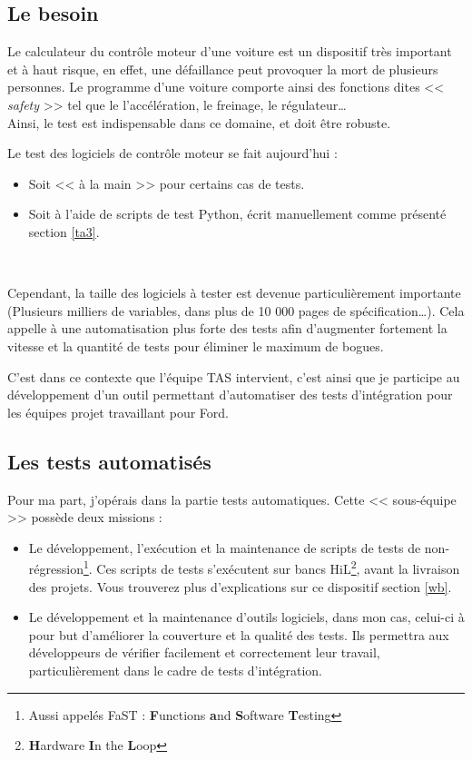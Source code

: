 \subsection{Le besoin} \label{besoinTests}
Le calculateur du contrôle moteur d'une voiture est un dispositif très important et à haut risque, en effet, une défaillance peut provoquer la mort de plusieurs personnes. Le programme d'une voiture comporte ainsi des fonctions dites << \textit{safety} >> tel que le l'accélération, le freinage, le régulateur\ldots\\
Ainsi, le test est indispensable dans ce domaine, et doit être robuste. 

Le test des logiciels de contrôle moteur se fait aujourd'hui : 
\begin{itemize}
	\item Soit << à la main >> pour certains cas de tests.
	\item Soit à l'aide de scripts de test Python, écrit manuellement comme présenté section \ref{ta3}.
\end{itemize}~

Cependant, la taille des logiciels à tester est devenue particulièrement importante (Plusieurs milliers de variables, dans plus de 10 000 pages de spécification\ldots). Cela appelle à une automatisation plus forte des tests afin d'augmenter fortement la vitesse et la quantité de tests pour éliminer le maximum de bogues.

C'est dans ce contexte que l'équipe TAS intervient, c'est ainsi que je participe au développement d'un outil permettant d'automatiser des tests d'intégration pour les équipes projet travaillant pour Ford.
\subsection{Les tests automatisés}

Pour ma part, j'opérais dans la partie tests automatiques. Cette << sous-équipe >> possède deux missions : 
\begin{itemize}
	\item Le développement, l'exécution et la maintenance de scripts de tests de non-régression\footnote{Aussi appelés FaST : \textbf{F}unctions \textbf{a}nd \textbf{S}oftware \textbf{T}esting}. Ces scripts de tests s'exécutent sur bancs HiL\footnote{\textbf{H}ardware \textbf{I}n the \textbf{L}oop}, avant la livraison des projets. Vous trouverez plus d'explications sur ce dispositif section \ref{wb}. 
	\item Le développement et la maintenance d'outils logiciels, dans mon cas, celui-ci à pour but d'améliorer la couverture et la qualité des tests. Ils permettra aux développeurs de vérifier facilement et correctement leur travail, particulièrement dans le cadre de tests d'intégration.
\end{itemize}

